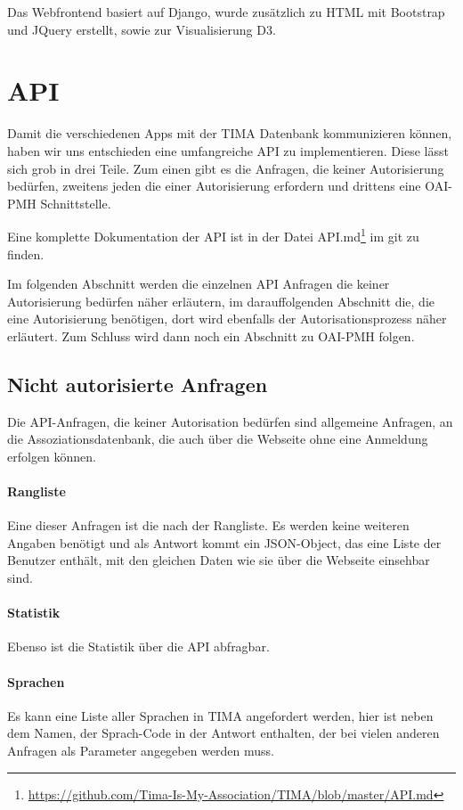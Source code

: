 Das Webfrontend basiert auf Django, wurde zusätzlich zu HTML mit Bootstrap und JQuery erstellt, sowie zur Visualisierung D3.

\section{API}
Damit die verschiedenen Apps mit der TIMA Datenbank kommunizieren können, haben wir uns entschieden eine umfangreiche API zu implementieren. Diese lässt sich grob in drei Teile. Zum einen gibt es die Anfragen, die keiner Autorisierung bedürfen, zweitens jeden die einer Autorisierung erfordern und drittens eine OAI-PMH Schnittstelle.

Eine komplette Dokumentation der API ist in der Datei API.md\footnote{\url{https://github.com/Tima-Is-My-Association/TIMA/blob/master/API.md}} im git zu finden.

Im folgenden Abschnitt werden die einzelnen API Anfragen die keiner Autorisierung bedürfen näher erläutern, im darauffolgenden Abschnitt die, die eine Autorisierung benötigen, dort wird ebenfalls der Autorisationsprozess näher erläutert. Zum Schluss wird dann noch ein Abschnitt zu OAI-PMH folgen.

\subsection{Nicht autorisierte Anfragen}
Die API-Anfragen, die keiner Autorisation bedürfen sind allgemeine Anfragen, an die Assoziationsdatenbank, die auch über die Webseite ohne eine Anmeldung erfolgen können.

\paragraph{Rangliste} Eine dieser Anfragen ist die nach der Rangliste. Es werden keine weiteren Angaben benötigt und als Antwort kommt ein JSON-Object, das eine Liste der Benutzer enthält, mit den gleichen Daten wie sie über die Webseite einsehbar sind.

\paragraph{Statistik} Ebenso ist die Statistik über die API abfragbar.

\paragraph{Sprachen} Es kann eine Liste aller Sprachen in TIMA angefordert werden, hier ist neben dem Namen, der Sprach-Code in der Antwort enthalten, der bei vielen anderen Anfragen als Parameter angegeben werden muss.

